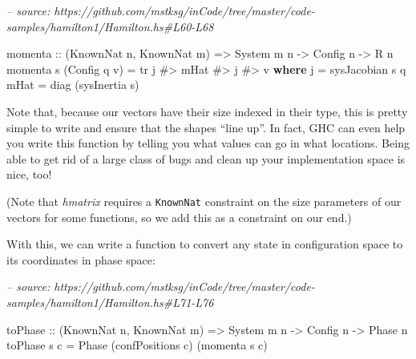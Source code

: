 \documentclass[]{article}
\newenvironment{Shaded}{}{}
\newcommand{\CommentTok}[1]{\textcolor[rgb]{0.38,0.63,0.69}{\textit{#1}}}
\newcommand{\DataTypeTok}[1]{\textcolor[rgb]{0.56,0.13,0.00}{#1}}
\newcommand{\FunctionTok}[1]{\textcolor[rgb]{0.02,0.16,0.49}{#1}}
\newcommand{\KeywordTok}[1]{\textcolor[rgb]{0.00,0.44,0.13}{\textbf{#1}}}
\newcommand{\NormalTok}[1]{#1}
\newcommand{\OtherTok}[1]{\textcolor[rgb]{0.00,0.44,0.13}{#1}}
\begin{document}
\begin{Shaded}
\begin{Highlighting}[]
\CommentTok{-- source: https://github.com/mstksg/inCode/tree/master/code-samples/hamilton1/Hamilton.hs#L60-L68}

\NormalTok{momenta}
\OtherTok{    ::}\NormalTok{ (}\DataTypeTok{KnownNat}\NormalTok{ n, }\DataTypeTok{KnownNat}\NormalTok{ m)}
    \OtherTok{=>} \DataTypeTok{System}\NormalTok{ m n}
    \OtherTok{->} \DataTypeTok{Config}\NormalTok{ n}
    \OtherTok{->} \DataTypeTok{R}\NormalTok{ n}
\NormalTok{momenta s (}\DataTypeTok{Config}\NormalTok{ q v) }\FunctionTok{=}\NormalTok{ tr j }\FunctionTok{#>}\NormalTok{ mHat }\FunctionTok{#>}\NormalTok{ j }\FunctionTok{#>}\NormalTok{ v}
  \KeywordTok{where}
\NormalTok{    j    }\FunctionTok{=}\NormalTok{ sysJacobian s q}
\NormalTok{    mHat }\FunctionTok{=}\NormalTok{ diag (sysInertia s)}
\end{Highlighting}
\end{Shaded}

Note that, because our vectors have their size indexed in their type, this is
pretty simple to write and ensure that the shapes ``line up''. In fact, GHC can
even help you write this function by telling you what values can go in what
locations. Being able to get rid of a large class of bugs and clean up your
implementation space is nice, too!

(Note that \emph{hmatrix} requires a \texttt{KnownNat} constraint on the size
parameters of our vectors for some functions, so we add this as a constraint on
our end.)

With this, we can write a function to convert any state in configuration space
to its coordinates in phase space:

\begin{Shaded}
\begin{Highlighting}[]
\CommentTok{-- source: https://github.com/mstksg/inCode/tree/master/code-samples/hamilton1/Hamilton.hs#L71-L76}

\NormalTok{toPhase}
\OtherTok{    ::}\NormalTok{ (}\DataTypeTok{KnownNat}\NormalTok{ n, }\DataTypeTok{KnownNat}\NormalTok{ m)}
    \OtherTok{=>} \DataTypeTok{System}\NormalTok{ m n}
    \OtherTok{->} \DataTypeTok{Config}\NormalTok{ n}
    \OtherTok{->} \DataTypeTok{Phase}\NormalTok{ n}
\NormalTok{toPhase s c }\FunctionTok{=} \DataTypeTok{Phase}\NormalTok{ (confPositions c) (momenta s c)}
\end{Highlighting}
\end{Shaded}
\end{document}

